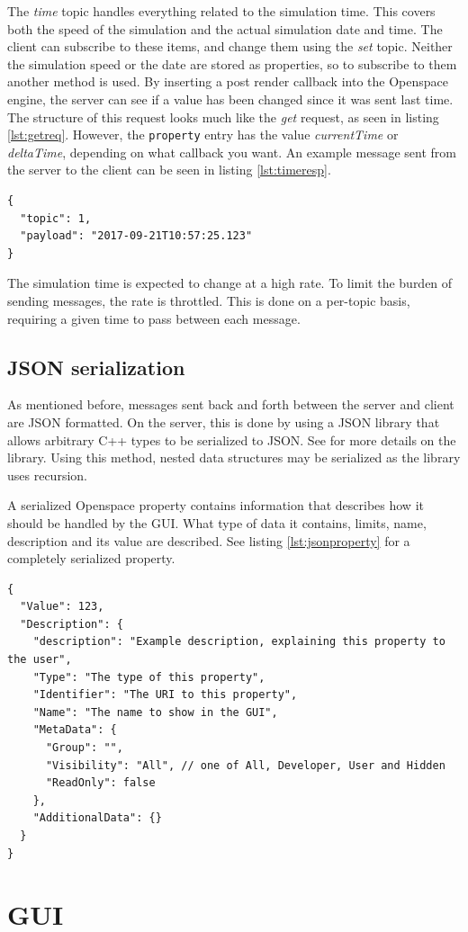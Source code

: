 The \emph{time} topic handles everything related to the simulation time. This covers both the speed of the simulation and the actual simulation date and time. The client can subscribe to these items, and change them using the \emph{set} topic. Neither the simulation speed or the date are stored as properties, so to subscribe to them another method is used. By inserting a post render callback into the Openspace engine, the server can see if a value has been changed since it was sent last time. The structure of this request looks much like the \emph{get} request, as seen in listing \ref{lst:getreq}. However, the \texttt{property} entry has the value \emph{currentTime} or \emph{deltaTime}, depending on what callback you want. An example message sent from the server to the client can be seen in listing \ref{lst:timeresp}.

\begin{lstlisting}[caption={Example response for the time topic, sending the current simulation time.},label=lst:timeresp]
{
  "topic": 1,
  "payload": "2017-09-21T10:57:25.123"
}
\end{lstlisting}

The simulation time is expected to change at a high rate. To limit the burden of sending messages, the rate is throttled. This is done on a per-topic basis, requiring a given time to pass between each message.

\subsection{JSON serialization}

As mentioned before, messages sent back and forth between the server and client are JSON formatted. On the server, this is done by using a JSON library that allows arbitrary C++ types to be serialized to JSON. See \cite{jsonlib} for more details on the library. Using this method, nested data structures may be serialized as the library uses recursion.

A serialized Openspace property contains information that describes how it should be handled by the GUI. What type of data it contains, limits, name, description and its value are described. See listing \ref{lst:jsonproperty} for a completely serialized property.

\begin{lstlisting}[caption={},label=lst:jsonproperty]
{
  "Value": 123,
  "Description": {
    "description": "Example description, explaining this property to the user",
    "Type": "The type of this property",
    "Identifier": "The URI to this property",
    "Name": "The name to show in the GUI",
    "MetaData": {
      "Group": "",
      "Visibility": "All", // one of All, Developer, User and Hidden
      "ReadOnly": false
    },
    "AdditionalData": {}
  }
}
\end{lstlisting}

\section{GUI}
